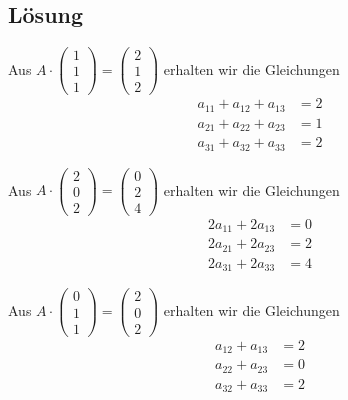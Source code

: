 \subsection*{L\"osung}
Aus $A\cdot \begin{pmatrix}1\\1\\1 \end{pmatrix}= \begin{pmatrix}2 \\ 1 \\ 2 \end{pmatrix}$ erhalten wir die Gleichungen
\begin{align*}
a_{11} + a_{12} + a_{13}&=2 \\
a_{21}+a_{22}+a_{23}&=1\\
a_{31}+a_{32}+a_{33}&=2
\end{align*}

Aus $A\cdot \begin{pmatrix}2\\0\\2 \end{pmatrix}= \begin{pmatrix}0 \\ 2 \\ 4 \end{pmatrix}$ erhalten wir die Gleichungen
\begin{align*}
2a_{11} +2 a_{13}&=0 \\
2a_{21}+2a_{23}&=2\\
2a_{31}+2a_{33}&=4
\end{align*}

Aus $A\cdot \begin{pmatrix}0\\1\\1 \end{pmatrix}= \begin{pmatrix}2 \\ 0 \\ 2 \end{pmatrix}$ erhalten wir die Gleichungen
\begin{align*}
a_{12} + a_{13}&=2 \\
a_{22}+a_{23}&=0\\
a_{32}+a_{33}&=2
\end{align*}

